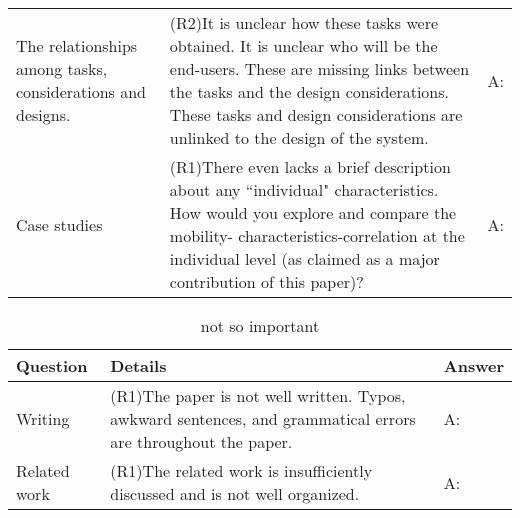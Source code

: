 \documentclass[UTF8]{article}
\begin{document}
\begin{table}[h]
\begin{tabular}{|p{4cm}|p{9cm}|p{4cm}|}
    The relationships among tasks, considerations and designs. & (R2)It is unclear how these tasks were obtained. It is unclear who will be the end-users. These are missing links between the tasks and the design considerations. These tasks and design considerations are unlinked to the design of the system.\newline  & A:\color{red}{Adding experts discussion to rewrite these parts.}\\
    
    Case studies & (R1)There even lacks a brief description about any ``individual" characteristics. How would you explore and compare the mobility- characteristics-correlation at the individual level (as claimed as a major contribution of this paper)?\newline & A: \\
    \hline
    \end{tabular}
\end{table}


\begin{table}[h]
\centering
\caption{not so important}
    \begin{tabular}{|p{3cm}|p{9cm}|p{5cm}|}
    \hline
    Question & Details & Answer \\
    \hline
    Writing & (R1)The paper is not well written. Typos, awkward sentences, and grammatical errors are throughout the paper.\newline & A: \\

    Related work & (R1)The related work is insufficiently discussed and is not well organized.\newline & A: \\

    \hline
    \end{tabular}
\end{table}
\end{document}
